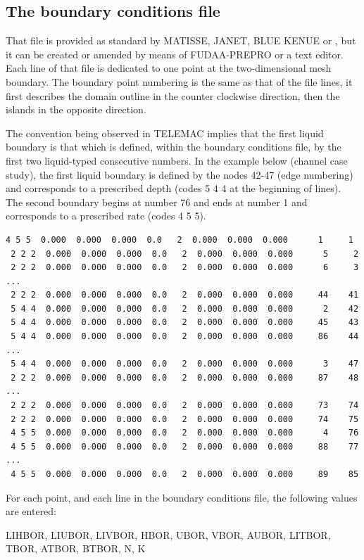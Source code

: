 \subsection{The boundary conditions file}
\label{sec:bndfile}
That file is provided as standard by MATISSE, JANET, BLUE KENUE or \stbtel, but
it can be created or amended by means of FUDAA-PREPRO or a text editor. Each
line of that file is dedicated to one point at the two-dimensional mesh
boundary. The boundary point numbering is the same as that of the file lines,
it first describes the domain outline in the counter clockwise direction, then
the islands in the opposite direction.

The convention being observed in TELEMAC implies that the first liquid boundary
is that which is defined, within the boundary conditions file, by the first two
liquid-typed consecutive numbers. In the example below (channel case study),
the first liquid boundary is defined by the nodes 42-47 (edge numbering) and
corresponds to a prescribed depth (codes 5 4 4 at the beginning of lines). The
second boundary begins at number 76 and ends at number 1 and corresponds to a
prescribed rate (codes 4 5 5).

\begin{lstlisting}[language=bash]
 4 5 5  0.000  0.000  0.000  0.0   2  0.000  0.000  0.000      1     1
 2 2 2  0.000  0.000  0.000  0.0   2  0.000  0.000  0.000      5     2
 2 2 2  0.000  0.000  0.000  0.0   2  0.000  0.000  0.000      6     3
...
 2 2 2  0.000  0.000  0.000  0.0   2  0.000  0.000  0.000     44    41
 5 4 4  0.000  0.000  0.000  0.0   2  0.000  0.000  0.000      2    42
 5 4 4  0.000  0.000  0.000  0.0   2  0.000  0.000  0.000     45    43
 5 4 4  0.000  0.000  0.000  0.0   2  0.000  0.000  0.000     86    44
...
 5 4 4  0.000  0.000  0.000  0.0   2  0.000  0.000  0.000      3    47
 2 2 2  0.000  0.000  0.000  0.0   2  0.000  0.000  0.000     87    48
...
 2 2 2  0.000  0.000  0.000  0.0   2  0.000  0.000  0.000     73    74
 2 2 2  0.000  0.000  0.000  0.0   2  0.000  0.000  0.000     74    75
 4 5 5  0.000  0.000  0.000  0.0   2  0.000  0.000  0.000      4    76
 4 5 5  0.000  0.000  0.000  0.0   2  0.000  0.000  0.000     88    77
...
 4 5 5  0.000  0.000  0.000  0.0   2  0.000  0.000  0.000     89    85
\end{lstlisting}

For each point, and each line in the boundary conditions file, the following
values are entered:

LIHBOR, LIUBOR, LIVBOR, HBOR, UBOR, VBOR, AUBOR, LITBOR, TBOR, ATBOR,
BTBOR, N, K

